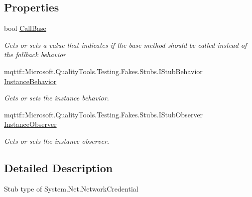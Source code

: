 \subsection*{Properties}
\begin{DoxyCompactItemize}
\item 
bool \hyperlink{class_system_1_1_net_1_1_fakes_1_1_stub_network_credential_ae2d889cdf81a345c089f73f6d2775646}{Call\-Base}
\begin{DoxyCompactList}\small\item\em Gets or sets a value that indicates if the base method should be called instead of the fallback behavior\end{DoxyCompactList}\item 
mqttf\-::\-Microsoft.\-Quality\-Tools.\-Testing.\-Fakes.\-Stubs.\-I\-Stub\-Behavior \hyperlink{class_system_1_1_net_1_1_fakes_1_1_stub_network_credential_a0903c3f2fdecd22731af96c0e08f3aec}{Instance\-Behavior}
\begin{DoxyCompactList}\small\item\em Gets or sets the instance behavior.\end{DoxyCompactList}\item 
mqttf\-::\-Microsoft.\-Quality\-Tools.\-Testing.\-Fakes.\-Stubs.\-I\-Stub\-Observer \hyperlink{class_system_1_1_net_1_1_fakes_1_1_stub_network_credential_aab3c0a9382659e209838692837700125}{Instance\-Observer}
\begin{DoxyCompactList}\small\item\em Gets or sets the instance observer.\end{DoxyCompactList}\end{DoxyCompactItemize}


\subsection{Detailed Description}
Stub type of System.\-Net.\-Network\-Credential



